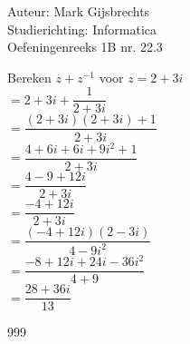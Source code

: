 \documentclass[a4paper]{article}
\begin{document}
\noindent \large Auteur: Mark Gijsbrechts \\
\noindent \large Studierichting: Informatica\\
\noindent \large Oefeningenreeks 1B nr. 22.3\\

\medskip

\normalsize



Bereken $ z + z^{-1}$ voor $z = 2 + 3i$ \\


$=2 + 3i + \dfrac{1}{2 + 3i}$ \\

$=\dfrac{(2+3i)(2+3i)+1}{2 + 3i}$ \\

$=\dfrac{4 + 6i + 6i + 9i^2 + 1}{2 + 3i}$ \\

$=\dfrac{4 - 9 + 12i}{2 + 3i}$ \\

$=\dfrac{-4 + 12i}{2 + 3i}$ \\

$=\dfrac{(-4 + 12i)(2-3i)}{4 - 9i^2}$ \\

$=\dfrac{-8 + 12i + 24i -36i^2}{4 + 9}$ \\

$=\dfrac{28 + 36i}{13}$ \\


\begin{thebibliography}{999}
\end{thebibliography}
\end{document}
